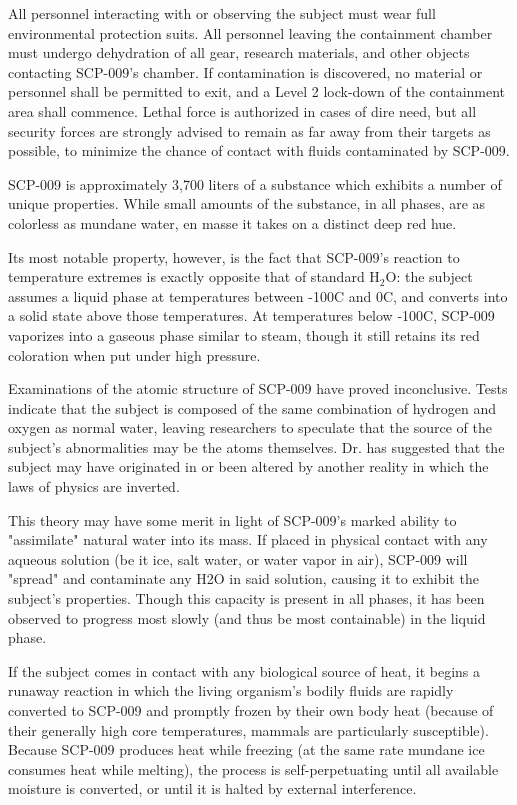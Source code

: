 All personnel interacting with or observing the subject must wear full environmental protection suits. All personnel leaving the containment chamber must undergo dehydration of all gear, research materials, and other objects contacting SCP-009's chamber. If contamination is discovered, no material or personnel shall be permitted to exit, and a Level 2 lock-down of the containment area shall commence. Lethal force is authorized in cases of dire need, but all security forces are strongly advised to remain as far away from their targets as possible, to minimize the chance of contact with fluids contaminated by SCP-009.

 SCP-009 is approximately 3,700 liters of a substance which exhibits a number of unique properties. While small amounts of the substance, in all phases, are as colorless as mundane water, en masse it takes on a distinct deep red hue.

Its most notable property, however, is the fact that SCP-009's reaction to temperature extremes is exactly opposite that of standard H$_{2}$O: the subject assumes a liquid phase at temperatures between -100\degree C and 0\degree C, and converts into a solid state above those temperatures. At temperatures below -100\degree C, SCP-009 vaporizes into a gaseous phase similar to steam, though it still retains its red coloration when put under high pressure.

Examinations of the atomic structure of SCP-009 have proved inconclusive. Tests indicate that the subject is composed of the same combination of hydrogen and oxygen as normal water, leaving researchers to speculate that the source of the subject's abnormalities may be the atoms themselves. Dr.  has suggested that the subject may have originated in or been altered by another reality in which the laws of physics are inverted.

This theory may have some merit in light of SCP-009's marked ability to "assimilate" natural water into its mass. If placed in physical contact with any aqueous solution (be it ice, salt water, or water vapor in air), SCP-009 will "spread" and contaminate any H2O in said solution, causing it to exhibit the subject's properties. Though this capacity is present in all phases, it has been observed to progress most slowly (and thus be most containable) in the liquid phase.

If the subject comes in contact with any biological source of heat, it begins a runaway reaction in which the living organism's bodily fluids are rapidly converted to SCP-009 and promptly frozen by their own body heat (because of their generally high core temperatures, mammals are particularly susceptible). Because SCP-009 produces heat while freezing (at the same rate mundane ice consumes heat while melting), the process is self-perpetuating until all available moisture is converted, or until it is halted by external interference.

